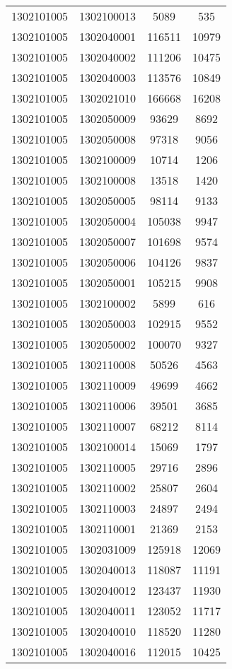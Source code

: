 \begin{longtable}[h]{llcc}
		1302101005 & 1302100013 & 5089 & 535\\
		1302101005 & 1302040001 & 116511 & 10979\\
		1302101005 & 1302040002 & 111206 & 10475\\
		1302101005 & 1302040003 & 113576 & 10849\\
		1302101005 & 1302021010 & 166668 & 16208\\
		1302101005 & 1302050009 & 93629 & 8692\\
		1302101005 & 1302050008 & 97318 & 9056\\
		1302101005 & 1302100009 & 10714 & 1206\\
		1302101005 & 1302100008 & 13518 & 1420\\
		1302101005 & 1302050005 & 98114 & 9133\\
		1302101005 & 1302050004 & 105038 & 9947\\
		1302101005 & 1302050007 & 101698 & 9574\\
		1302101005 & 1302050006 & 104126 & 9837\\
		1302101005 & 1302050001 & 105215 & 9908\\
		1302101005 & 1302100002 & 5899 & 616\\
		1302101005 & 1302050003 & 102915 & 9552\\
		1302101005 & 1302050002 & 100070 & 9327\\
		1302101005 & 1302110008 & 50526 & 4563\\
		1302101005 & 1302110009 & 49699 & 4662\\
		1302101005 & 1302110006 & 39501 & 3685\\
		1302101005 & 1302110007 & 68212 & 8114\\
		1302101005 & 1302100014 & 15069 & 1797\\
		1302101005 & 1302110005 & 29716 & 2896\\
		1302101005 & 1302110002 & 25807 & 2604\\
		1302101005 & 1302110003 & 24897 & 2494\\
		1302101005 & 1302110001 & 21369 & 2153\\
		1302101005 & 1302031009 & 125918 & 12069\\
		1302101005 & 1302040013 & 118087 & 11191\\
		1302101005 & 1302040012 & 123437 & 11930\\
		1302101005 & 1302040011 & 123052 & 11717\\
		1302101005 & 1302040010 & 118520 & 11280\\
		1302101005 & 1302040016 & 112015 & 10425\\

\end{longtable}

